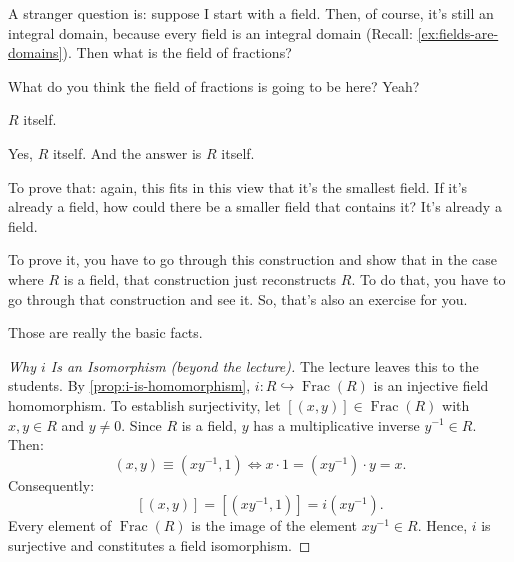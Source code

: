 \begin{speech}[01:14:49 - 01:15:25]
A stranger question is: suppose I start with a field.  Then, of course, it's still an integral domain,  because every field is an integral domain (Recall: \cref{ex:fields-are-domains}). Then what is the field of fractions? 

What do you think the field of fractions is going to be here? Yeah?
\end{speech}

\begin{student}
$R$ itself.
\end{student}

\begin{speech}[01:15:28 - 01:16:00]
Yes, $R$ itself. And the answer is $R$ itself. 

To prove that: again, this fits in this view that it's the smallest field. If it's already a field, how could there be a smaller field that contains it? It's already a field.

To prove it, you have to go through this construction and show that in the case where $R$ is a field, that construction just reconstructs $R$. To do that, you have to go through that construction and see it. So, that's also an exercise for you.

Those are really the basic facts.
\end{speech}

\begin{content}

\begin{proof}[Why $i$ Is an Isomorphism (beyond the lecture)]
The lecture leaves this to the students. By \cref{prop:i-is-homomorphism}, $i \colon R \hookrightarrow \operatorname{Frac}(R)$ is an injective field homomorphism. To establish surjectivity, let $[(x, y)] \in \operatorname{Frac}(R)$ with $x, y \in R$ and $y \ne 0$.
Since $R$ is a field, $y$ has a multiplicative inverse $y^{-1} \in R$. Then:
\[
(x, y) \equiv (x y^{-1}, 1) \iff x \cdot 1 = (x y^{-1}) \cdot y = x.
\]
Consequently:
\[
[(x, y)] = [(x y^{-1}, 1)] = i(x y^{-1}).
\]
Every element of $\operatorname{Frac}(R)$ is the image of the element $x y^{-1} \in R$. Hence, $i$ is surjective and constitutes a field isomorphism.
\end{proof}
\end{content}

